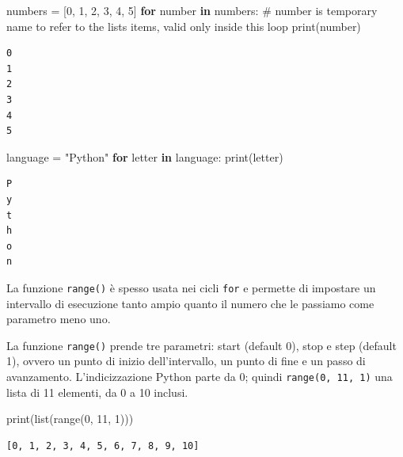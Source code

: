 \documentclass[
  letterpaper,
  krantz2]{{[}./krantz{]}}
\newenvironment{Shaded}{\begin{snugshade}}{\end{snugshade}}
\newcommand{\BuiltInTok}[1]{\textcolor[rgb]{0.00,0.23,0.31}{#1}}
\newcommand{\CommentTok}[1]{\textcolor[rgb]{0.37,0.37,0.37}{#1}}
\newcommand{\ControlFlowTok}[1]{\textcolor[rgb]{0.00,0.23,0.31}{\textbf{#1}}}
\newcommand{\DecValTok}[1]{\textcolor[rgb]{0.68,0.00,0.00}{#1}}
\newcommand{\KeywordTok}[1]{\textcolor[rgb]{0.00,0.23,0.31}{\textbf{#1}}}
\newcommand{\NormalTok}[1]{\textcolor[rgb]{0.00,0.23,0.31}{#1}}
\newcommand{\OperatorTok}[1]{\textcolor[rgb]{0.37,0.37,0.37}{#1}}
\newcommand{\StringTok}[1]{\textcolor[rgb]{0.13,0.47,0.30}{#1}}
\begin{document}
\begin{Shaded}
\begin{Highlighting}[]
\NormalTok{numbers }\OperatorTok{=}\NormalTok{ [}\DecValTok{0}\NormalTok{, }\DecValTok{1}\NormalTok{, }\DecValTok{2}\NormalTok{, }\DecValTok{3}\NormalTok{, }\DecValTok{4}\NormalTok{, }\DecValTok{5}\NormalTok{]}
\ControlFlowTok{for}\NormalTok{ number }\KeywordTok{in}\NormalTok{ numbers: }\CommentTok{\# number is temporary name to refer to the list\textquotesingle{}s items, valid only inside this loop}
    \BuiltInTok{print}\NormalTok{(number)}
\end{Highlighting}
\end{Shaded}

\begin{verbatim}
0
1
2
3
4
5
\end{verbatim}

\begin{Shaded}
\begin{Highlighting}[]
\NormalTok{language }\OperatorTok{=} \StringTok{"Python"}
\ControlFlowTok{for}\NormalTok{ letter }\KeywordTok{in}\NormalTok{ language:}
    \BuiltInTok{print}\NormalTok{(letter)}
\end{Highlighting}
\end{Shaded}

\begin{verbatim}
P
y
t
h
o
n
\end{verbatim}

La funzione \texttt{range()} è spesso usata nei cicli \texttt{for} e
permette di impostare un intervallo di esecuzione tanto ampio quanto il
numero che le passiamo come parametro meno uno.

La funzione \texttt{range()} prende tre parametri: start (default 0),
stop e step (default 1), ovvero un punto di inizio dell'intervallo, un
punto di fine e un passo di avanzamento. L'indicizzazione Python parte
da 0; quindi \texttt{range(0,\ 11,\ 1)} una lista di 11 elementi, da 0 a
10 inclusi.

\begin{Shaded}
\begin{Highlighting}[]
\BuiltInTok{print}\NormalTok{(}\BuiltInTok{list}\NormalTok{(}\BuiltInTok{range}\NormalTok{(}\DecValTok{0}\NormalTok{, }\DecValTok{11}\NormalTok{, }\DecValTok{1}\NormalTok{)))}
\end{Highlighting}
\end{Shaded}

\begin{verbatim}
[0, 1, 2, 3, 4, 5, 6, 7, 8, 9, 10]
\end{verbatim}
\end{document}
